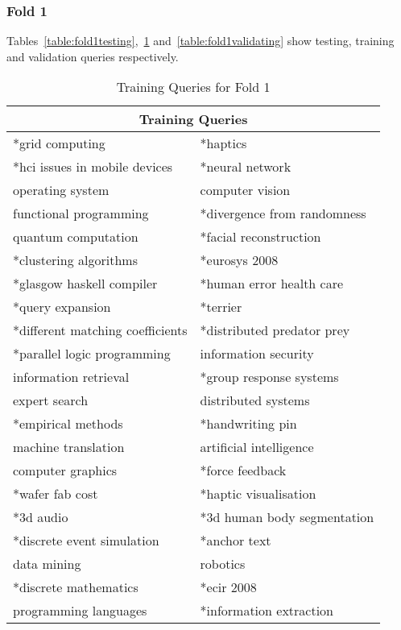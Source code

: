 \subsubsection{Fold 1}
Tables~\ref{table:fold1testing},~\ref{table:fold1training} and~\ref{table:fold1validating} show testing, training and validation queries respectively.

\begin{table}
\centering
\begin{tabular}{|l|l|}

\hline \multicolumn{2}{|c|}{\textbf{Training Queries}} \\
\hline *grid computing & *haptics \\
\hline *hci issues in mobile devices & *neural network \\
\hline operating system & computer vision\\
\hline functional programming & *divergence from randomness\\ 
\hline quantum computation & *facial reconstruction \\
\hline *clustering algorithms & *eurosys 2008\\ 
\hline *glasgow haskell compiler & *human error health care \\
\hline *query expansion & *terrier \\ 
\hline *different matching coefficients & *distributed predator prey \\
\hline *parallel logic programming & information security\\ 
\hline information retrieval & *group response systems\\
\hline expert search & distributed systems\\ 
\hline *empirical methods & *handwriting pin\\
\hline machine translation & artificial intelligence\\
\hline computer graphics & *force feedback\\
\hline *wafer fab cost & *haptic visualisation\\
\hline *3d audio & *3d human body segmentation\\
\hline *discrete event simulation & *anchor text\\
\hline data mining & robotics\\
\hline *discrete mathematics & *ecir 2008\\
\hline programming languages & *information extraction \\
\hline
\end{tabular}
\caption{Training Queries for Fold 1} \label{table:fold1training}
\end{table}


